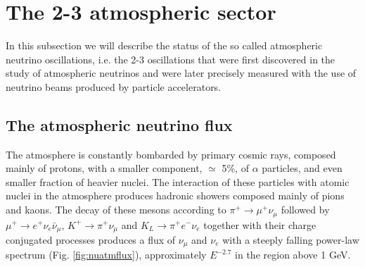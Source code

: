 \section{The 2-3 atmospheric sector }

In this subsection we will describe the status of the so called atmospheric neutrino oscillations, i.e. the 2-3 oscillations that were first discovered in the study of atmospheric neutrinos and were later precisely measured with the use of neutrino beams produced by particle accelerators.   


\subsection{The atmospheric neutrino flux}

The atmosphere is constantly bombarded by primary cosmic rays, composed mainly of protons, with a smaller component, $\simeq$ 5\%, of $\alpha$ particles, and even smaller fraction of heavier nuclei. The interaction of these particles with atomic nuclei in the atmosphere produces hadronic showers composed mainly of pions and kaons. The decay of these mesons according to 
$\pi^+ \rightarrow \mu^+ \nu_\mu$ followed by 
$\mu^+ \rightarrow e^+ \nu_e \bar{\nu}_\mu $,
$K^+ \rightarrow \pi^+ \nu_\mu$ and $K_L \rightarrow \pi^+ e^- \nu_e$
together with their charge conjugated processes produces a flux of $\nu_\mu$ and $\nu_e$ with a steeply falling power-law spectrum (Fig. \ref{fig:nuatmflux}), approximately $E^{-2.7}$ in the region above 1 GeV.   


